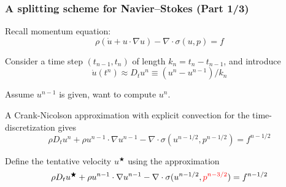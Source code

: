 \begin{frame}
  \frametitle{A splitting scheme for Navier--Stokes (Part 1/3)}

  \vspace{1em}
  Recall momentum equation:
  \begin{equation*}
    \rho (\dot{u} + u \cdot \nabla u) - \nabla \cdot \sigma(u, p) = f
  \end{equation*}

  Consider a time step $(t_{n-1}, t_{n})$ of length $k_n = t_{n} -
  t_{n-1}$, and introduce
  \begin{equation*}
  \dot{u}(t^n) \approx D_t u^n \equiv (u^n - u^{n-1}) / k_n
  \end{equation*}

  \medskip

  \alert{Assume $u^{n-1}$ is given, want to compute $u^{n}$}.

  \medskip

  A Crank-Nicolson approximation with explicit convection for the
  time-discretization gives
  \begin{equation*}
    \rho D_t u^n + \rho u^{n-1} \cdot \nabla u^{n-1}
    - \nabla \cdot \sigma(u^{n-1/2}, p^{n-1/2})
    = f^{n-1/2}
  \end{equation*}

  Define the \alert{tentative velocity} $u^{\bigstar}$ using
  the approximation
  \begin{equation}
    \rho D_t u^{\bigstar} + \rho u^{n-1} \cdot \nabla u^{n-1}
    - \nabla \cdot \sigma(u^{n-1/2}, \textcolor{red}{p^{n-3/2}})
    = f^{n-1/2}
  \end{equation}

\end{frame}
